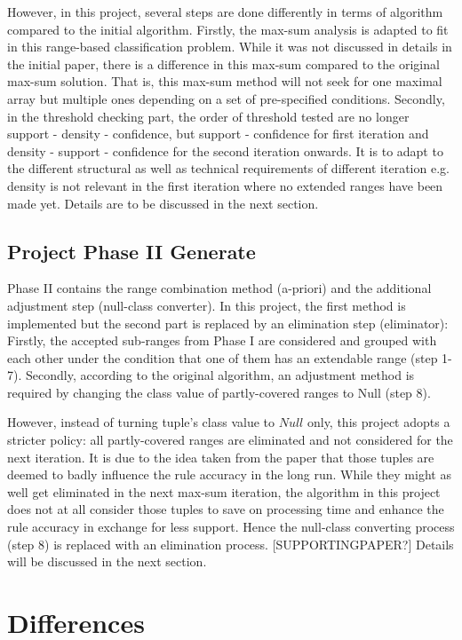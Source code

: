 However, in this project, several steps are done differently in terms of algorithm compared to the initial algorithm. Firstly, the max-sum analysis is adapted to fit in this range-based classification problem. While it was not discussed in details in the initial paper, there is a difference in this max-sum compared to the original max-sum solution. That is, this max-sum method will not seek for one maximal array but multiple ones depending on a set of pre-specified conditions. Secondly, in the threshold checking part, the order of threshold tested are no longer support - density - confidence, but support - confidence for first iteration and density - support - confidence for the second iteration onwards. It is to adapt to the different structural as well as technical requirements of different iteration e.g. density is not relevant in the first iteration where no extended ranges have been made yet. Details are to be discussed in the next section.

\subsection{Project Phase II Generate}

Phase II contains the range combination method (a-priori) and the additional adjustment step (null-class converter). In this project, the first method is implemented but the second part is replaced by an elimination step (eliminator): Firstly, the accepted sub-ranges from Phase I are considered and grouped with each other under the condition that one of them has an extendable range (step 1-7). Secondly, according to the original algorithm, an adjustment method is required by changing the class value of partly-covered ranges to Null (step 8). 

However, instead of turning tuple's class value to $Null$ only, this project adopts a stricter policy: all partly-covered ranges are eliminated and not considered for the next iteration. It is due to the idea taken from the paper that those tuples are deemed to badly influence the rule accuracy in the long run. While they might as well get eliminated in the next max-sum iteration, the algorithm in this project does not at all consider those tuples to save on processing time and enhance the rule accuracy in exchange for less support. Hence the null-class converting process (step 8) is replaced with an elimination process. [SUPPORTINGPAPER?] Details will be discussed in the next section.

\section{Differences}

